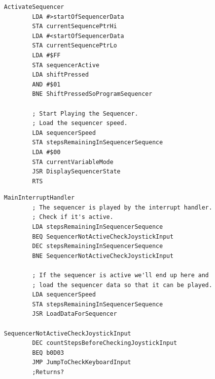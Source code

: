 \begin{lstlisting}[caption=From \icode{ActivateSequencer}. \icode{sequencerSpeed} is loaded to \icode{stepsRemainingInSequencerSequence}.]
ActivateSequencer 
        LDA #>startOfSequencerData
        STA currentSequencePtrHi
        LDA #<startOfSequencerData
        STA currentSequencePtrLo
        LDA #$FF
        STA sequencerActive
        LDA shiftPressed
        AND #$01
        BNE ShiftPressedSoProgramSequencer

        ; Start Playing the Sequencer.
        ; Load the sequencer speed.
        LDA sequencerSpeed
        STA stepsRemainingInSequencerSequence
        LDA #$00
        STA currentVariableMode
        JSR DisplaySequencerState
        RTS 
\end{lstlisting}


\begin{lstlisting}[caption=From \icode{MainInterruptHandler}. \icode{stepsRemainingInSequencerSequence} tells us whether to 'play' a step in the
sequencer at each raster interrupt.]
MainInterruptHandler
        ; The sequencer is played by the interrupt handler.
        ; Check if it's active.
        LDA stepsRemainingInSequencerSequence
        BEQ SequencerNotActiveCheckJoystickInput
        DEC stepsRemainingInSequencerSequence
        BNE SequencerNotActiveCheckJoystickInput

        ; If the sequencer is active we'll end up here and
        ; load the sequencer data so that it can be played.
        LDA sequencerSpeed
        STA stepsRemainingInSequencerSequence
        JSR LoadDataForSequencer

SequencerNotActiveCheckJoystickInput   
        DEC countStepsBeforeCheckingJoystickInput
        BEQ b0D03
        JMP JumpToCheckKeyboardInput
        ;Returns?
\end{lstlisting}
